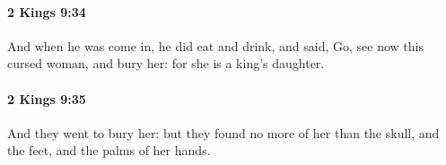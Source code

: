		\paragraph{2 Kings 9:34} %
			\label{2KINGS-9-34}

			And when he was come in, he did eat and drink, and said, Go, see now this cursed woman, and bury her: for she is a king’s daughter.


		\paragraph{2 Kings 9:35} %
			\label{2KINGS-9-35}

			And they went to bury her: but they found no more of her than the skull, and the feet, and the palms of her hands.


